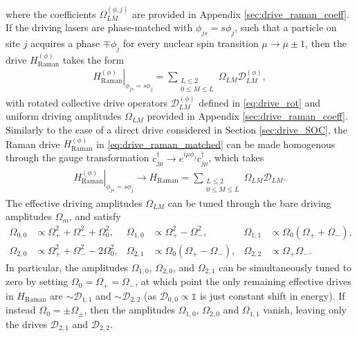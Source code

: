 \documentclass[nofootinbib,notitlepage,11pt]{revtex4-2}
\renewcommand{\t}{\text} %
\newcommand{\p}[1]{\left(#1\right)} %
\newcommand{\1}{\mathds{1}}
\newcommand{\D}{\mathcal{D}}
\begin{document}
where the coefficients $\Omega_{LM}^{(\phi,j)}$ are provided in
Appendix \ref{sec:drive_raman_coeff}.  If the driving lasers are
phase-matched with $\phi_{js}=s\phi_j$, such that a particle on site
$j$ acquires a phase $\mp\phi_j$ for every nuclear spin transition
$\mu\to\mu\pm1$, then the drive $H_{\t{Raman}}^{(\phi)}$ takes the
form
\begin{align}
  \left. H_{\t{Raman}}^{(\phi)} \right|_{\phi_{js}=s\phi_j}
  = \sum_{\substack{L\le2\\0\le M\le L}} \Omega_{LM} \D_{LM}^{(\phi)},
  \label{eq:drive_raman_matched}
\end{align}
with rotated collective drive operators $\D_{LM}^{(\phi)}$ defined in
\eqref{eq:drive_rot} and uniform driving amplitudes $\Omega_{LM}$
provided in Appendix \ref{sec:drive_raman_coeff}.  Similarly to the
case of a direct drive considered in Section \ref{sec:drive_SOC}, the
Raman drive $H_{\t{Raman}}^{(\phi)}$ in \eqref{eq:drive_raman_matched}
can be made homogenous through the gauge transformation
$c_{j\mu}^\dag \to e^{i\mu\phi_j} c_{j\mu}^\dag$, which takes
\begin{align}
  \left. H_{\t{Raman}}^{(\phi)} \right|_{\phi_{js}=s\phi_j}
  \to H_{\t{Raman}}
  = \sum_{\substack{L\le2\\0\le M\le L}} \Omega_{LM} \D_{LM}.
\end{align}
The effective driving amplitudes $\Omega_{LM}$ can be tuned through
the bare driving amplitudes $\Omega_m$, and satisfy
\begin{align}
  \Omega_{0,0} &\propto \Omega_+^2 + \Omega_-^2 + \Omega_0^2,
  &
  \Omega_{1,0} &\propto \Omega_+^2 - \Omega_-^2,
  &
  \Omega_{1,1} &\propto \Omega_0 \p{\Omega_+ + \Omega_-}, \\
  \Omega_{2,0} &\propto \Omega_+^2 + \Omega_-^2 - 2\Omega_0^2,
  &
  \Omega_{2,1} &\propto \Omega_0 \p{\Omega_+ - \Omega_-},
  &
  \Omega_{2,2} &\propto \Omega_+ \Omega_-.
\end{align}
In particular, the amplitudes $\Omega_{1,0}$, $\Omega_{2,0}$, and
$\Omega_{2,1}$ can be simultaneously tuned to zero by setting
$\Omega_0=\Omega_+=\Omega_-$, at which point the only remaining
effective drives in $H_{\t{Raman}}$ are $\sim\D_{1,1}$ and
$\sim\D_{2,2}$ (as $\D_{0,0}\propto\1$ is just constant shift in
energy).  If instead $\Omega_0=\pm\Omega_\pm$, then the amplitudes
$\Omega_{1,0}$, $\Omega_{2,0}$ and $\Omega_{1,1}$ vanish, leaving only
the drives $\D_{2,1}$ and $\D_{2,2}$.

\end{document}
